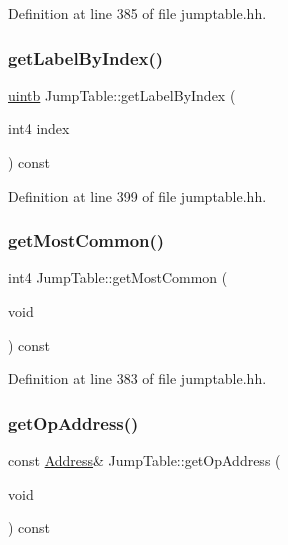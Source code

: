 Definition at line 385 of file jumptable.\+hh.

\mbox{\label{class_jump_table_ac0524721754a4e17fcccd2e66278c65c}} 
\subsubsection{\texorpdfstring{getLabelByIndex()}{getLabelByIndex()}}
{\footnotesize\ttfamily \mbox{\hyperlink{types_8h_a2db313c5d32a12b01d26ac9b3bca178f}{uintb}} Jump\+Table\+::get\+Label\+By\+Index (\begin{DoxyParamCaption}\item[{int4}]{index }\end{DoxyParamCaption}) const\hspace{0.3cm}{\ttfamily [inline]}}



Definition at line 399 of file jumptable.\+hh.

\mbox{\label{class_jump_table_a0c76ef1e110791cd1175ba1c6b9d5c82}} 
\subsubsection{\texorpdfstring{getMostCommon()}{getMostCommon()}}
{\footnotesize\ttfamily int4 Jump\+Table\+::get\+Most\+Common (\begin{DoxyParamCaption}\item[{void}]{ }\end{DoxyParamCaption}) const\hspace{0.3cm}{\ttfamily [inline]}}



Definition at line 383 of file jumptable.\+hh.

\mbox{\label{class_jump_table_a98e5d9d6c61755969ae9c32eb3013af4}} 
\subsubsection{\texorpdfstring{getOpAddress()}{getOpAddress()}}
{\footnotesize\ttfamily const \mbox{\hyperlink{class_address}{Address}}\& Jump\+Table\+::get\+Op\+Address (\begin{DoxyParamCaption}\item[{void}]{ }\end{DoxyParamCaption}) const\hspace{0.3cm}{\ttfamily [inline]}}



